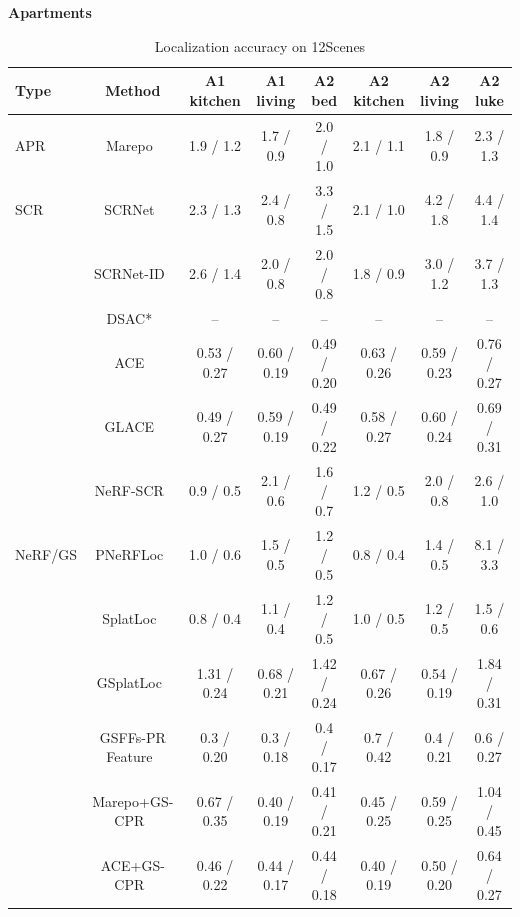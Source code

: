 \begin{table}[tp]
\centering
\footnotesize
\setlength{\tabcolsep}{2.5pt}
\renewcommand{\arraystretch}{1.1}
\caption{Localization accuracy on 12Scenes}
\label{tab:t3}
\par\smallskip\textbf{Apartments}\par\smallskip
\begin{tabular}{lccccccc}
\toprule
Type & Method & A1 kitchen & A1 living & A2 bed & A2 kitchen & A2 living & A2 luke \\
\midrule
APR & Marepo~\cite{reported260504730v1bibbib24} & 1.9 / 1.2 & 1.7 / 0.9 & 2.0 / 1.0 & 2.1 / 1.1 & 1.8 / 0.9 & 2.3 / 1.3 \\
\midrule
SCR & SCRNet~\cite{reported260504730v1bibbib38} & 2.3 / 1.3 & 2.4 / 0.8 & 3.3 / 1.5 & 2.1 / 1.0 & 4.2 / 1.8 & 4.4 / 1.4 \\
 & SCRNet-ID~\cite{reported260504730v1bibbib62} & 2.6 / 1.4 & 2.0 / 0.8 & 2.0 / 0.8 & 1.8 / 0.9 & 3.0 / 1.2 & 3.7 / 1.3 \\
 & DSAC*~\cite{brachmann2021dsacstar} & -- & -- & -- & -- & -- & -- \\
 & ACE~\cite{brachmann2023ace} & 0.53 / 0.27 & 0.60 / 0.19 & 0.49 / 0.20 & 0.63 / 0.26 & 0.59 / 0.23 & 0.76 / 0.27 \\
 & GLACE~\cite{reported260504730v1bibbib37} & 0.49 / 0.27 & 0.59 / 0.19 & 0.49 / 0.22 & 0.58 / 0.27 & 0.60 / 0.24 & 0.69 / 0.31 \\
 & NeRF-SCR~\cite{reported260504730v1bibbib8} & 0.9 / 0.5 & 2.1 / 0.6 & 1.6 / 0.7 & 1.2 / 0.5 & 2.0 / 0.8 & 2.6 / 1.0 \\
\midrule
NeRF/GS & PNeRFLoc~\cite{reported250319358v1bibbib68} & 1.0 / 0.6 & 1.5 / 0.5 & 1.2 / 0.5 & 0.8 / 0.4 & 1.4 / 0.5 & 8.1 / 3.3 \\
 & SplatLoc~\cite{zhai2025splatloc} & 0.8 / 0.4 & 1.1 / 0.4 & 1.2 / 0.5 & 1.0 / 0.5 & 1.2 / 0.5 & 1.5 / 0.6 \\
 & GSplatLoc~\cite{reported260504730v1bibbib47} & 1.31 / 0.24 & 0.68 / 0.21 & 1.42 / 0.24 & 0.67 / 0.26 & 0.54 / 0.19 & 1.84 / 0.31 \\
 & GSFFs-PR Feature~\cite{reported260504730v1bibbib52} & 0.3 / 0.20 & 0.3 / 0.18 & 0.4 / 0.17 & 0.7 / 0.42 & 0.4 / 0.21 & 0.6 / 0.27 \\
 & Marepo+GS-CPR~\cite{reported260504730v1bibbib61} & 0.67 / 0.35 & 0.40 / 0.19 & 0.41 / 0.21 & 0.45 / 0.25 & 0.59 / 0.25 & 1.04 / 0.45 \\
 & ACE+GS-CPR~\cite{reported260504730v1bibbib61} & 0.46 / 0.22 & 0.44 / 0.17 & 0.44 / 0.18 & 0.40 / 0.19 & 0.50 / 0.20 & 0.64 / 0.27 \\

\end{tabular}
\end{table}
